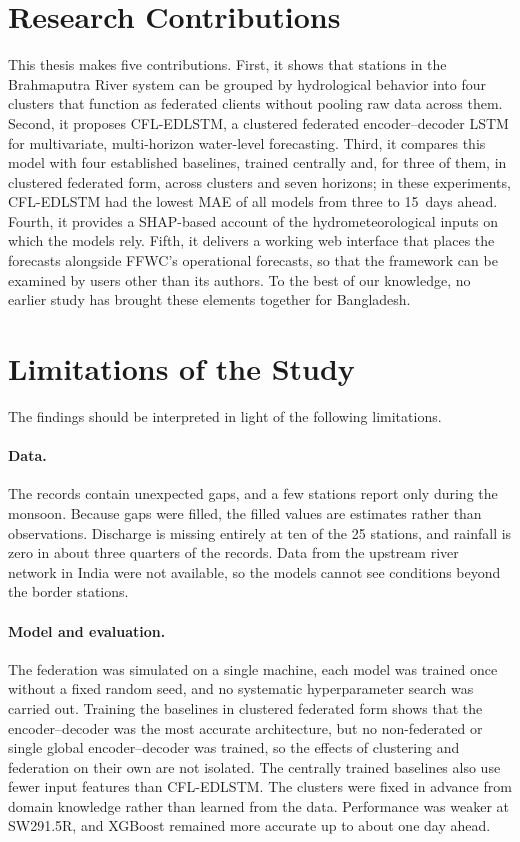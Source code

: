 \section{Research Contributions}
\label{sec:5.5}

This thesis makes five contributions. First, it shows that stations in the
Brahmaputra River system can be grouped by hydrological behavior into four
clusters that function as federated clients without pooling raw data across
them. Second, it proposes CFL-EDLSTM, a clustered federated encoder--decoder
LSTM for multivariate, multi-horizon water-level forecasting. Third, it compares
this model with four established baselines, trained centrally and, for three of
them, in clustered federated form, across clusters and seven horizons; in these
experiments, CFL-EDLSTM had the lowest MAE of all models from three to 15~days
ahead. Fourth, it provides a SHAP-based account of the hydrometeorological
inputs on which the models rely. Fifth, it delivers a working web interface
that places the forecasts alongside FFWC's operational forecasts, so that the
framework can be examined by users other than its authors. To the best of our
knowledge, no earlier study has brought these elements together for Bangladesh.

\section{Limitations of the Study}
\label{sec:5.6}

The findings should be interpreted in light of the following limitations.

\paragraph{Data.}
The records contain unexpected gaps, and a few stations report only during the
monsoon. Because gaps were filled, the filled values are estimates rather than
observations. Discharge is missing entirely at ten of the 25 stations, and
rainfall is zero in about three quarters of the records. Data from the upstream
river network in India were not available, so the models cannot see conditions
beyond the border stations.

\paragraph{Model and evaluation.}
The federation was simulated on a single machine, each model was trained once
without a fixed random seed, and no systematic hyperparameter search was
carried out. Training the baselines in clustered federated form shows that the
encoder--decoder was the most accurate architecture, but no non-federated or
single global encoder--decoder was trained, so the effects of clustering and
federation on their own are not isolated. The centrally trained baselines also
use fewer input features than CFL-EDLSTM. The clusters were fixed in advance
from domain knowledge rather than learned from the data. Performance was weaker
at SW291.5R, and XGBoost remained more accurate up to about one day ahead.

